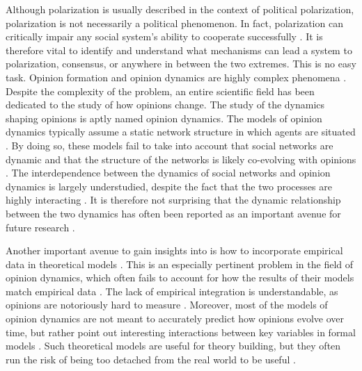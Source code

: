 \documentclass[11pt]{article}
\begin{document}
\noindent Although polarization is usually described in the context of political polarization, polarization is not necessarily a political phenomenon. In fact, polarization can critically impair any social system's ability to cooperate successfully \cite{levin_dynamics_2021}. It is therefore vital to identify and understand what mechanisms can lead a system to polarization, consensus, or anywhere in between the two extremes. This is no easy task. Opinion formation and opinion dynamics are highly complex phenomena \cite{baumann2021modeling}. 
Despite the complexity of the problem, an entire scientific field has been dedicated to the study of how opinions change. The study of the dynamics shaping opinions is aptly named opinion dynamics. The models of opinion dynamics typically assume a static network structure in which agents are situated \cite{galesic_integrating_2021}. By doing so, these models fail to take into account that social networks are dynamic and that the structure of the networks is likely co-evolving with opinions \cite{de2022modelling,galesic_integrating_2021}. The interdependence between the dynamics of social networks and opinion dynamics is largely understudied, despite the fact that the two processes are highly interacting \cite{asikainen_cumulative_2020,bruch_agent-based_2015,galesic_integrating_2021,kossinets_origins_2009,noorazar_classical_2020}. It is therefore not surprising that the dynamic relationship between the two dynamics has often been reported as an important avenue for future research \cite{flache_models_2017,galesic_integrating_2021}. 

\noindent Another important avenue to gain insights into is how to incorporate empirical data in theoretical models \cite{mas2019challenges}. This is an especially pertinent problem in the field of opinion dynamics, which often fails to account for how the results of their models match empirical data \cite{galesic_integrating_2021,flache_models_2017, mas2019challenges}. 
The lack of empirical integration is understandable, as opinions are notoriously hard to measure \cite{mas2019challenges}. Moreover, most of the models of opinion dynamics are not meant to accurately predict how opinions evolve over time, but rather point out interesting interactions between key variables in formal models \cite{mas2019challenges}. Such theoretical models are useful for theory building, but they often run the risk of being too detached from the real world to be useful \cite{smaldino_how_2020, mas2019challenges}.  
\end{document}
